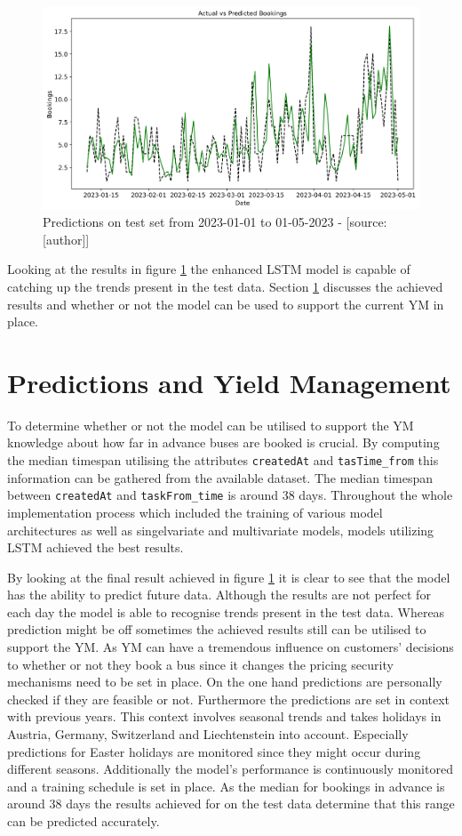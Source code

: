 \begin{figure}[H]
	\centering
		\includegraphics[width=14cm]{images/lstm_multi_1_prediction}
	\caption{Predictions on test set from 2023-01-01 to 01-05-2023 - [source:[author]]}
	\label{fig:lstm_multi_1_prediction}
\end{figure}
Looking at the results in figure \ref{fig:lstm_multi_1_prediction} the enhanced LSTM model is capable of catching up the trends present in the test data. Section \ref{sec:pred_and_ym} discusses the achieved results and whether or not the model can be used to support the current YM in place.

\section{Predictions and Yield Management}
\label{sec:pred_and_ym}
To determine whether or not the model can be utilised to support the YM knowledge about how far in advance buses are booked is crucial. By computing the median timespan utilising the attributes \verb|createdAt| and \verb|tasTime_from| this information can be gathered from the available dataset. The median timespan between \verb|createdAt| and \verb|taskFrom_time| is around 38 days. Throughout the whole implementation process which included the training of various model architectures as well as singelvariate and multivariate models, models utilizing LSTM achieved the best results. 

By looking at the final result achieved in figure \ref{fig:lstm_multi_1_prediction} it is clear to see that the model has the ability to predict future data. Although the results are not perfect for each day the model is able to recognise trends present in the test data. Whereas prediction might be off sometimes the achieved results still can be utilised to support the YM. As YM can have a tremendous influence on customers' decisions to whether or not they book a bus since it changes the pricing security mechanisms need to be set in place. On the one hand predictions are personally checked if they are feasible or not. Furthermore the predictions are set in context with previous years. This context involves seasonal trends and takes holidays in Austria, Germany, Switzerland and Liechtenstein into account. Especially predictions for Easter holidays are monitored since they might occur during different seasons. Additionally the model's performance is continuously monitored and a training schedule is set in place.
As the median for bookings in advance is around 38 days the results achieved for on the test data determine that this range can be predicted accurately.